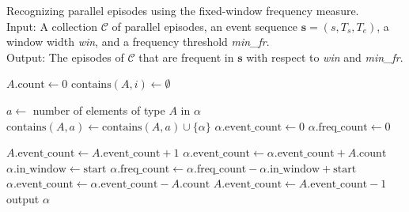 \begin{algorithm}

\caption{Recognizing parallel episodes using the fixed-window frequency measure. \\
Input: A collection $ \mathcal{C} $ of parallel episodes, an event sequence $ \boldsymbol{s} = (s, T_s, T_e) $, a window width \textit{win}, and a frequency threshold \textit{min\_fr}. \\
Output: The episodes of $ \mathcal{C} $ that are frequent in $ \boldsymbol{s} $ with respect to \textit{win} and \textit{min\_fr}.
}

\begin{algorithmic}[1]

        \State $ A \text{.count} \gets 0 $
         $ \text{contains}(A, i) \gets \emptyset $ \EndFor
    \EndFor
\EndFor

        \State $ a \gets $ number of elements of type $ A $ in $ \alpha $
        \State $ \text{contains}(A, a) \gets \text{contains}(A, a) \cup \{ \alpha \} $
    \EndFor
    \State $ \alpha \text{.event\_count} \gets 0 $
    \State $ \alpha \text{.freq\_count} \gets 0 $
\EndFor

     \label{alglin:rec-par-fwi:new-events}
        \State $ A \text{.event\_count} \gets A \text{.event\_count} + 1 $
            \State $ \alpha \text{.event\_count} \gets \alpha \text{.event\_count} + A \text{.count} $
             $ \alpha \text{.in\_window} \gets \text{start} $
            \EndIf
        \EndFor
    \EndFor
     \label{alglin:rec-par-fwi:old-events}
                \State $ \alpha \text{.freq\_count} \gets \alpha \text{.freq\_count} - \alpha \text{.in\_window} + \text{start} $
            \EndIf
            \State $ \alpha \text{.event\_count} \gets \alpha \text{.event\_count} - A \text{.count} $
        \EndFor
        \State $ A \text{.event\_count} \gets A \text{.event\_count} - 1 $
    \EndFor
\EndFor
{}
     output $ \alpha $
    \EndIf
\EndFor

\end{algorithmic}

\label{alg:rec-par-fwi}
\end{algorithm}

